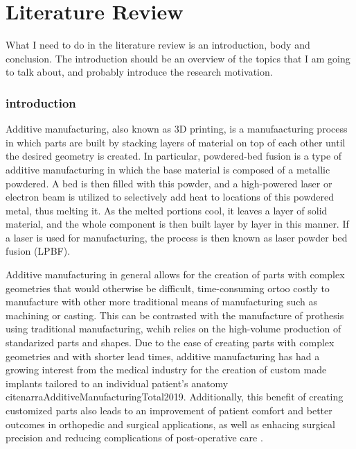 \documentclass[../main.tex]{subfiles}
\begin{document}
	
\chapter{Literature Review}

What I need to do in the literature review is an introduction, body and conclusion. The introduction should be an overview of the topics that I am going to talk about, and probably introduce the research motivation.

\subsection{introduction}

Additive manufacturing, also known as 3D printing, is a manufaacturing process in which parts are built by stacking layers of material on top of each other until the desired geometry is created. In particular, powdered-bed fusion is a type of additive manufacturing in which the base material is composed of a metallic powdered. A bed is then filled with this powder, and a high-powered laser or electron beam is utilized to selectively add heat to locations of this powdered metal, thus melting it. As the melted portions cool, it leaves a layer of solid material, and the whole component is then built layer by layer in this manner. If a laser is used for manufacturing, the process is then known as laser powder bed fusion (LPBF).

Additive manufacturing in general allows for the creation of parts with complex geometries that would otherwise be difficult, time-consuming ortoo costly to manufacture with other more traditional means of manufacturing such as machining or casting. This can be contrasted with the manufacture of prothesis using traditional manufacturing, wchih relies on the high-volume production of standarized parts and shapes. Due to the ease of creating parts with complex geometries and with shorter lead times, additive manufacturing has had a growing interest from the medical industry for the creation of custom made implants tailored to an individual patient's anatomy \cite{marshTrendsDevelopmentsHip2021} \\cite{narraAdditiveManufacturingTotal2019}. Additionally, this benefit of creating customized parts also leads to an improvement of patient comfort and better outcomes in orthopedic and surgical applications, as well as enhacing surgical precision and reducing complications of post-operative care \cite{mobarakRecentAdvancesAdditive2023} \cite{pathak3DPrintingBiomedicine2023}.
\end{document}
